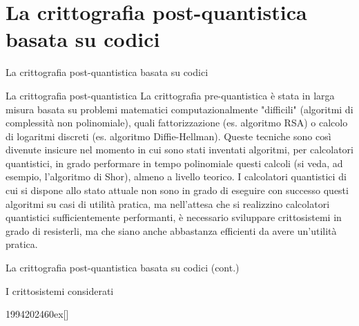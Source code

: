 \documentclass[10pt]{beamer}
\begin{document}
	\section{La crittografia post-quantistica basata su codici}
		\begin{frame}{La crittografia post-quantistica basata su codici}
			\begin{block}{La crittografia post-quantistica}
				La crittografia pre-quantistica è stata in larga misura basata su problemi matematici computazionalmente "difficili" (algoritmi di complessità non polinomiale), quali fattorizzazione (es. algoritmo RSA) o calcolo di logaritmi discreti (es. algoritmo Diffie-Hellman). Queste tecniche sono così divenute insicure nel momento in cui sono stati inventati algoritmi, per calcolatori quantistici, in grado performare in tempo polinomiale questi calcoli (si veda, ad esempio, l’algoritmo di Shor), almeno a livello teorico. I calcolatori quantistici di cui si dispone allo stato attuale non sono in grado di eseguire con successo questi algoritmi su casi di utilità pratica, ma nell'attesa che si realizzino calcolatori quantistici sufficientemente performanti, è necessario sviluppare crittosistemi in grado di resisterli, ma che siano anche abbastanza efficienti da avere un’utilità pratica.
			\end{block}
		\end{frame}
		\begin{frame}{La crittografia post-quantistica basata su codici (cont.)}
			\begin{block}{I crittosistemi considerati}
				\begin{center}
					\begin{chronology}[5]{1994}{2024}{60ex}[\textwidth]
					\end{chronology}
				\end{center}
			\end{block}
		\end{frame}
\end{document}
